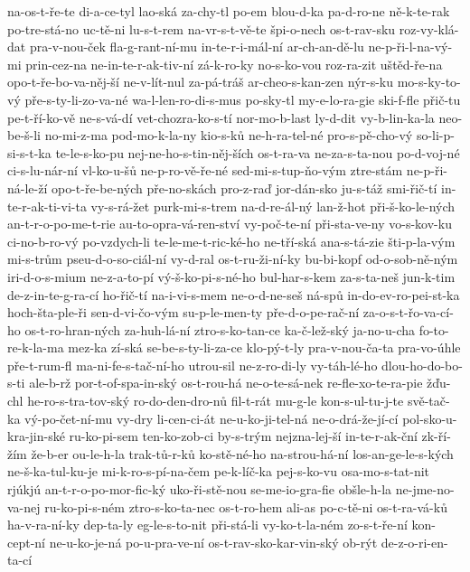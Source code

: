 na-os-t-ře-te
di-a-ce-tyl
lao-ská
za-chy-tl
po-em
blou-d-ka
pa-d-ro-ne
ně-k-te-rak
po-tre-stá-no
uc-tě-ni
lu-s-t-rem
na-vr-s-t-vě-te
špi-o-nech
os-t-rav-sku
roz-vy-klá-dat
pra-v-nou-ček
fla-g-rant-ní-mu
in-te-r-i-mál-ní
ar-ch-an-dě-lu
ne-p-ři-l-na-vý-mi
prin-cez-na
ne-in-te-r-ak-tiv-ní
zá-k-ro-ky
no-s-ko-vou
roz-ra-zit
uštěd-ře-na
opo-t-ře-bo-va-něj-ší
ne-v-lít-nul
za-pá-tráš
ar-cheo-s-kan-zen
nýr-s-ku
mo-s-ky-to-vý
pře-s-ty-li-zo-va-né
wa-l-len-ro-di-s-mus
po-sky-tl
my-e-lo-ra-gie
ski-f-fle
přič-tu
pe-t-ří-ko-vě
ne-s-vá-dí
vet-chozra-ko-s-tí
nor-mo-b-last
ly-d-dit
vy-b-lin-ka-la
neo-be-š-li
no-mi-z-ma
pod-mo-k-la-ny
kio-s-ků
ne-h-ra-tel-né
pro-s-pě-cho-vý
so-li-p-si-s-t-ka
te-le-s-ko-pu
nej-ne-ho-s-tin-něj-ších
os-t-ra-va
ne-za-s-ta-nou
po-d-voj-né
ci-s-lu-nár-ní
vl-ko-u-šů
ne-p-ro-vě-ře-né
sed-mi-s-tup-ňo-vým
ztre-stám
ne-p-ři-ná-le-ží
opo-t-ře-be-ných
pře-no-skách
pro-z-raď
jor-dán-sko
ju-s-táž
smi-řič-tí
in-te-r-ak-ti-vi-ta
vy-s-rá-žet
purk-mi-s-trem
na-d-re-ál-ný
lan-ž-hot
při-š-ko-le-ných
an-t-r-o-po-me-t-rie
au-to-opra-vá-ren-ství
vy-poč-te-ní
při-sta-ve-ny
vo-s-kov-ku
ci-no-b-ro-vý
po-vzdych-li
te-le-me-t-ric-ké-ho
ne-tří-ská
ana-s-tá-zie
šti-p-la-vým
mi-s-trům
pseu-d-o-so-ciál-ní
vy-d-ral
os-t-ru-ži-ní-ky
bu-bi-kopf
od-o-sob-ně-ným
iri-d-o-s-mium
ne-z-a-to-pí
vý-š-ko-pi-s-né-ho
bul-har-s-kem
za-s-ta-neš
jun-k-tim
de-z-in-te-g-ra-cí
ho-řič-tí
na-i-vi-s-mem
ne-o-d-ne-seš
ná-spů
in-do-ev-ro-pei-st-ka
hoch-šta-ple-ři
sen-d-vi-čo-vým
su-p-le-men-ty
pře-d-o-pe-rač-ní
za-o-s-t-řo-va-cí-ho
os-t-ro-hran-ných
za-huh-lá-ní
ztro-s-ko-tan-ce
ka-č-lež-ský
ja-no-u-cha
fo-to-re-k-la-ma
mez-ka
zí-ská
se-be-s-ty-li-za-ce
klo-pý-t-ly
pra-v-nou-ča-ta
pra-vo-úhle
pře-t-rum-fl
ma-ni-fe-s-tač-ní-ho
utrou-sil
ne-z-ro-di-ly
vy-táh-lé-ho
dlou-ho-do-bo-s-ti
ale-b-rž
por-t-of-spa-in-ský
os-t-rou-há
ne-o-te-sá-nek
re-fle-xo-te-ra-pie
žďu-chl
he-ro-s-tra-tov-ský
ro-do-den-dro-nů
fil-t-rát
mu-g-le
kon-s-ul-tu-j-te
svě-tač-ka
vý-po-čet-ní-mu
vy-dry
li-cen-ci-át
ne-u-ko-ji-tel-ná
ne-o-drá-že-jí-cí
pol-sko-u-kra-jin-ské
ru-ko-pi-sem
ten-ko-zob-ci
by-s-trým
nejzna-lej-ší
in-te-r-ak-ční
zk-ří-žím
že-b-er
ou-le-h-la
trak-tů-r-ků
ko-stě-né-ho
na-strou-há-ní
los-an-ge-le-s-kých
ne-š-ka-tul-ku-je
mi-k-ro-s-pí-na-čem
pe-k-líč-ka
pej-s-ko-vu
osa-mo-s-tat-nit
rjúkjú
an-t-r-o-po-mor-fic-ký
uko-ři-stě-nou
se-me-io-gra-fie
obšle-h-la
ne-jme-no-va-nej
ru-ko-pi-s-ném
ztro-s-ko-ta-nec
os-t-ro-hem
ali-as
po-c-tě-ni
os-t-ra-vá-ků
ha-v-ra-ní-ky
dep-ta-ly
eg-le-s-to-nit
při-stá-li
vy-ko-t-la-ném
zo-s-t-ře-ní
kon-cept-ní
ne-u-ko-je-ná
po-u-pra-ve-ní
os-t-rav-sko-kar-vin-ský
ob-rýt
de-z-o-ri-en-ta-cí
